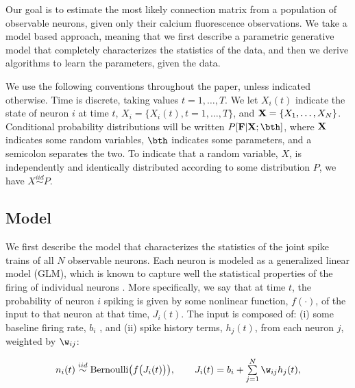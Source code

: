 Our goal is to estimate the most likely connection matrix from a population of observable neurons, given only their calcium fluorescence observations.  We take a model based approach, meaning that we first describe a parametric generative model that completely characterizes the statistics of the data, and then we derive algorithms to learn the parameters, given the data.  

We use the following conventions throughout the paper, unless indicated otherwise.  Time is discrete, taking values $t=1,\ldots,T$.  We let $X_i(t)$ indicate the state of neuron $i$ at time $t$, $X_i=\{X_i(t), t=1,\ldots, T\}$, and ${\bf X}= \{X_1, \ldots, X_N\}$.  Conditional probability distributions will be written $P[\bf F | \bf X; \bth]$, where $\bf X$ indicates some random variables, $\bth$ indicates some parameters, and a semicolon separates the two. To indicate that a random variable, $X$, is independently and identically distributed according to some distribution $P$, we have $X \overset{iid}{\sim} P$.


\subsection{Model} 
\label{sec:methods:markov-setup}
We first describe the model that characterizes the statistics of the joint spike trains of all $N$ observable neurons.  Each neuron is modeled as a generalized linear model (GLM), which is known to capture well the statistical properties of the firing of individual neurons \cite{PILL07, PAN03d, Wu07, Rigat06, OKA05}.  More specifically, we say that at time $t$, the probability of neuron $i$ spiking is given by some nonlinear function, $f(\cdot)$, of the input to that neuron at that time, $J_i(t)$.  The input is composed of: (i) some baseline firing rate, $b_i$%
, and (ii) spike history terms, $h_j(t)$, from each neuron $j$, weighted by $\w_{ij}$:

\begin{equation} \label{eqn:glm:definition}
\begin{array}{l}
n_i(t)\overset{iid}{\sim} \text{Bernoulli}\big(f\big(J_i(t)\big)\big), \qquad %
J_i(t)=b_i+\sum \limits_{j=1}^{N}  \w_{ij} h_{j}(t), %
\end{array}
\end{equation}

